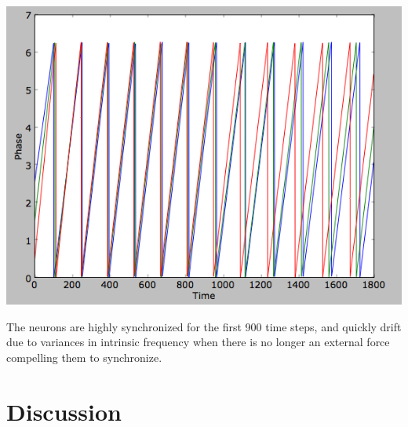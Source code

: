 \documentclass[12pt]{article}
\begin{document}
\vspace{10pt}
\includegraphics[scale=0.55]{desynchronize.png}

The neurons are highly synchronized for the first 900 time steps, and quickly drift due to variances in intrinsic frequency when there is no longer an external force compelling them to synchronize.  

\section{Discussion}





\end{document}

